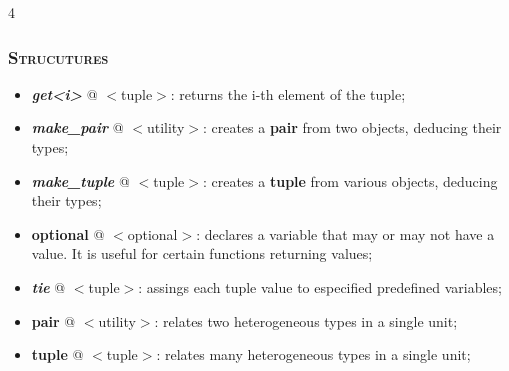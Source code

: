 \documentclass[10pt]{article}
\begin{document}
\begin{multicols*}{4}
{{\subsubsection*{\textsc{Strucutures}} 
\begin{itemize}[leftmargin=*,topsep=0.25pt]
  \setlength\itemsep{-1.8pt}
\item  \emph{{\textbf{get<i>}}} @ $<$tuple$>$: returns the i-th element of the tuple;  
\item  \emph{\textbf{make\_pair}} @ $<$utility$>$: creates a \textbf{pair} from two objects, deducing their types; 
\item  \emph{\textbf{make\_tuple}} @ $<$tuple$>$: creates a \textbf{tuple} from various objects, deducing their types; 
\item  {\textbf{optional}} @ $<$optional$>$: declares a variable that may or may not have a value. It is useful for certain functions returning values;
\item  \emph{\textbf{tie}} @ $<$tuple$>$: assings each tuple value to especified predefined variables; 
\item  {\textbf{pair}} @ $<$utility$>$: relates two heterogeneous types in a single unit; 
\item  {\textbf{tuple}} @ $<$tuple$>$: relates many heterogeneous types in a single unit;

\end{itemize}

}}
\end{multicols*}
\end{document}
